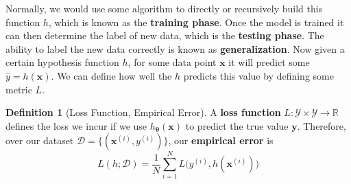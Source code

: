 \documentclass{article}
\theoremstyle{definition}
\theoremstyle{remark}
\theoremstyle{definition}
\newtheorem{definition}{Definition}[section]
\begin{document}
Normally, we would use some algorithm to directly or recursively build this function $h$, which is known as the \textbf{training phase}. Once the model is trained it can then determine the label of new data, which is the \textbf{testing phase}. The ability to label the new data correctly is known as \textbf{generalization}. Now given a certain hypothesis function $h$, for some data point $\mathbf{x}$ it will predict some $\hat{y} = h(\mathbf{x})$. We can define how well the $h$ predicts this value by defining some metric $L$. 

\begin{definition}[Loss Function, Empirical Error]
A \textbf{loss function} $L: \mathcal{Y} \times \mathcal{Y} \rightarrow \mathbb{R}$ defines the loss we incur if we use $h_{\boldsymbol{\theta}} (\mathbf{x})$ to predict the true value $\mathbf{y}$. Therefore, over our dataset $\mathcal{D} = \{(\mathbf{x}^{(i)}, y^{(i)})\}$, our \textbf{empirical error} is 
\[L(h; \mathcal{D}) = \frac{1}{N} \sum_{i=1}^N L\big( y^{(i)}, h(\mathbf{x}^{(i)}) \big)\]
\end{definition}
\end{document}
